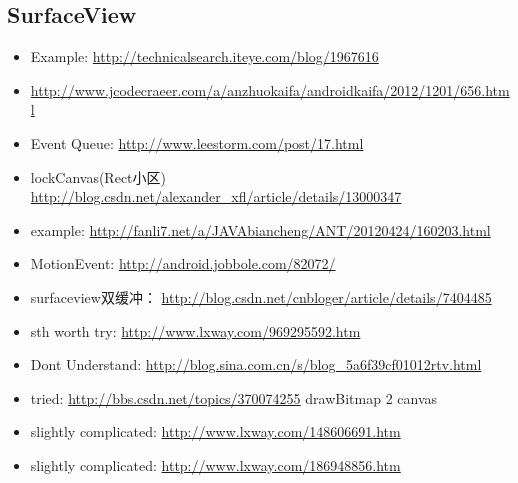 \documentclass[9pt,b5paper]{article}
\begin{document}
\subsection{SurfaceView}
\label{sec-4-1}
\begin{itemize}
\item Example: \url{http://technicalsearch.iteye.com/blog/1967616}
\item \url{http://www.jcodecraeer.com/a/anzhuokaifa/androidkaifa/2012/1201/656.html}
\item Event Queue: \url{http://www.leestorm.com/post/17.html}
\item lockCanvas(Rect小区) \url{http://blog.csdn.net/alexander_xfl/article/details/13000347}
\item example: \url{http://fanli7.net/a/JAVAbiancheng/ANT/20120424/160203.html}
\item MotionEvent: \url{http://android.jobbole.com/82072/}
\item surfaceview双缓冲： \url{http://blog.csdn.net/cnbloger/article/details/7404485}
\item sth worth try: \url{http://www.lxway.com/969295592.htm}
\item Dont Understand: \url{http://blog.sina.com.cn/s/blog_5a6f39cf01012rtv.html}
\item tried: \url{http://bbs.csdn.net/topics/370074255} drawBitmap 2 canvas
\item slightly complicated: \url{http://www.lxway.com/148606691.htm}
\item slightly complicated: \url{http://www.lxway.com/186948856.htm}
\end{itemize}
\end{document}
